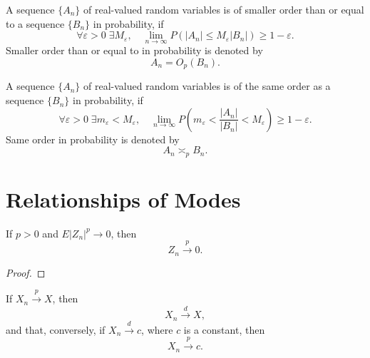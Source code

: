 \begin{definition}
    A sequence $\{A_n\}$ of real-valued random variables is of smaller order than or equal to a sequence $\{B_n\}$ in probability, if
    \begin{equation}
        \forall\varepsilon>0\;\exists M_\varepsilon,\quad\lim_{n\rightarrow\infty} P\left(|A_n|\leq M_\varepsilon|B_n|\right)\geq 1-\varepsilon.
    \end{equation}
    Smaller order than or equal to in probability is denoted by
    \begin{equation}
        A_n=O_p(B_n).
    \end{equation}
\end{definition}

\begin{definition}
    A sequence $\{A_n\}$ of real-valued random variables is of the same order as a sequence $\{B_n\}$ in probability, if
    \begin{equation}
        \forall\varepsilon>0\;\exists m_{\varepsilon}<M_{\varepsilon},\quad\lim_{n\rightarrow\infty} P\left(m_{\varepsilon}<\frac{|A_{n}|}{|B_{n}|}<M_{\varepsilon}\right)\geq 1-\varepsilon.
    \end{equation}
    Same order in probability is denoted by
    \begin{equation}
        A_{n}\asymp_{p}B_{n}.
    \end{equation}
\end{definition}

\section{Relationships of Modes}

\begin{lemma}
    If $p>0$ and $E\left|Z_{n}\right|^{p}\rightarrow 0$, then
    \begin{equation}
        Z_{n}\stackrel{p}{\rightarrow}0.
    \end{equation}
\end{lemma}

\begin{proof}

\end{proof}

\begin{theorem}
    If $X_{n}\stackrel{p}{\rightarrow}X$, then
    \begin{equation}
        X_{n}\stackrel{d}{\rightarrow}X,
    \end{equation}
    and that, conversely, if $X_{n}\stackrel{d}{\rightarrow}c$, where $c$ is a constant, then
    \begin{equation}
        X_{n}\stackrel{p}{\rightarrow}c.
    \end{equation}
\end{theorem}

